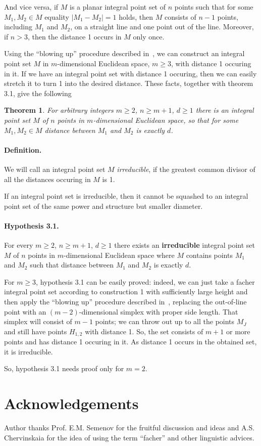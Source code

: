 \documentclass[a4paper,14pt]{article} %
\theoremstyle{plain}
\newtheorem{theorem}{Theorem}[section]
\begin{document}
And vice versa, if $M$ is a planar integral point set of $n$ points
such that for some $M_1,M_2 \in M$ equality $|M_1 - M_2|=1$ holds,
then $M$ consists of $n-1$ points, including $M_1$ and $M_2$, on a straight line and one point out of the line.
Moreover, if $n > 3$, then the distance 1 occurs in $M$ only once.

Using the ``blowing up'' procedure described in~\cite[theorem 1.3]{kurz2008bounds},
we can construct an integral point set $M$ in $m$-dimensional Euclidean space, $m\geq 3$,
with distance 1 occuring in it.
If we have an integral point set with distance 1 occuring,
then we can easily stretch it to turn 1 into the desired distance.
These facts, together with theorem 3.1, give the following

\begin{theorem}
	For arbitrary integers $m \geq 2$, $n \geq m+1$, $d \geq 1$
	there is an integral point set $M$ of $n$ points in $m$-dimensional Euclidean space,
	so that for some $M_1, M_2\in M$ distance between $M_1$ and $M_2$ is exactly $d$.
\end{theorem}

\paragraph{Definition.}
We will call an integral point set $M$ \textit{irreducible}, if the greatest common divisor
of all the distances occuring in $M$ is 1.

If an integral point set is irreducible,
then it cannot be squashed to an integral point set of the same power and structure but smaller diameter.

\paragraph{Hypothesis 3.1.}
For every $m \geq 2$, $n \geq m+1$, $d \geq 1$ there exists an \textbf{irreducible}
integral point set $M$ of $n$ points in $m$-dimensional Euclidean space
where $M$ contains points $M_1$ and $M_2$ such that distance between $M_1$ and $M_2$ is exactly $d$.

For $m \geq 3$, hypothesis 3.1 can be easily proved:
indeed, we can just take a facher integral point set according to construction 1
with sufficiently large height and then apply the ``blowing up'' procedure described in~\cite[Theorem 1.3]{kurz2008bounds},
replacing the out-of-line point with an $(m-2)$-dimensional simplex with proper side length.
That simplex will consist of $m-1$ points;
we can throw out up to all the points $M_J$ and still have points $H_{1,2}$ with distance 1.
So, the set consists of $m+1$ or more points and has distance 1 occuring in it.
As distance 1 occurs in the obtained set, it is irreducible.

So, hypothesis 3.1 needs proof only for $m=2$.

\section{Acknowledgements}
Author thanks Prof. E.M. Semenov for the fruitful discussion and ideas
and A.S. Chervinskaia for the idea of using the term ``facher'' and other linguistic advices.


\printbibliography
\end{document}
